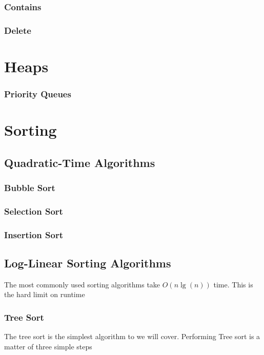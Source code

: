 \documentclass[10pt,a4paper]{book}
\begin{document}
\subsection{Contains}

\subsection{Delete}


\chapter{Heaps}


\subsection{Priority Queues}

\chapter{Sorting}


\section{Quadratic-Time Algorithms}

\subsection{Bubble Sort}

\subsection{Selection Sort}

\subsection{Insertion Sort}


\section{Log-Linear Sorting Algorithms}
The most commonly used sorting algorithms take $ O(n \lg(n)) $ time.
This is the hard limit on runtime %
\subsection{Tree Sort}
The tree sort is the simplest algorithm to we will cover. Performing Tree sort is a matter of three simple steps
\end{document}

